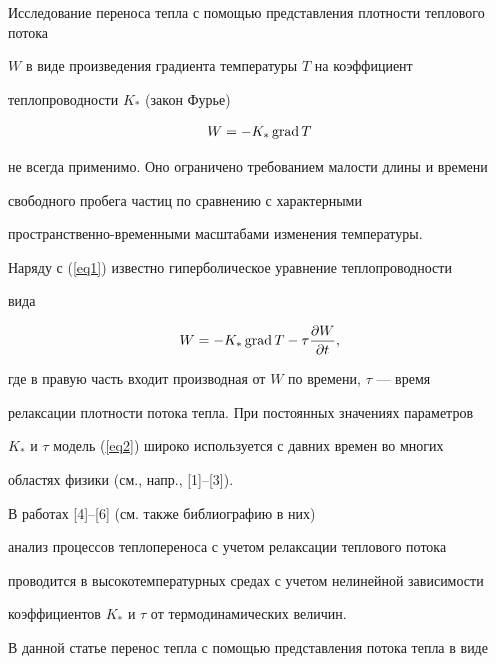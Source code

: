 \label{begin}








Исследование переноса тепла с помощью представления плотности теплового потока


$W$ в виде произведения градиента температуры $T$ на коэффициент


теплопроводности $K_*$ (закон Фурье)


\begin{equation}\label{eq1}


W=-K_*\Grad T


\end{equation}


не всегда применимо. Оно ограничено требованием малости длины и времени


свободного пробега частиц по сравнению с характерными


пространственно-временными масштабами изменения температуры.





Наряду с (\ref{eq1}) известно гиперболическое уравнение теплопроводности


вида


\begin{equation}\label{eq2}


W=-K_*\Grad T - \tau\frac{\partial W}{\partial t},


\end{equation}


где в правую часть входит производная от $W$ по времени, $\tau$ --- время


релаксации плотности потока тепла. При постоянных значениях параметров


$K_*$ и $\tau$ модель (\ref{eq2}) широко используется с давних времен во многих


областях физики (см., напр., [1]--[3]).


В работах [4]--[6] (см. также библиографию в них)


анализ процессов теплопереноса с учетом релаксации теплового потока


проводится в высокотемпературных средах с учетом нелинейной зависимости


коэффициентов $K_*$ и $\tau$ от термодинамических величин.





В данной статье перенос тепла с помощью представления потока тепла в виде


